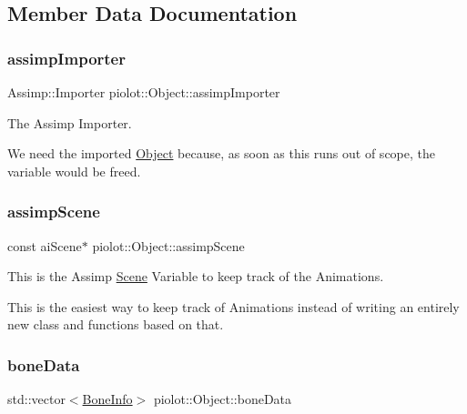 \subsection{Member Data Documentation}
\mbox{\label{classpiolot_1_1_object_a5c3cdbb5520b6ff452a9d248bb359cbd}} 
\subsubsection{\texorpdfstring{assimp\+Importer}{assimpImporter}}
{\footnotesize\ttfamily Assimp\+::\+Importer piolot\+::\+Object\+::assimp\+Importer\hspace{0.3cm}{\ttfamily [protected]}}



The Assimp Importer. 

We need the imported \mbox{\hyperlink{classpiolot_1_1_object}{Object}} because, as soon as this runs out of scope, the  variable would be freed. \mbox{\label{classpiolot_1_1_object_a169e800bae7a051cac9c2e11477a78f9}} 
\subsubsection{\texorpdfstring{assimp\+Scene}{assimpScene}}
{\footnotesize\ttfamily const ai\+Scene$\ast$ piolot\+::\+Object\+::assimp\+Scene\hspace{0.3cm}{\ttfamily [protected]}}



This is the Assimp \mbox{\hyperlink{classpiolot_1_1_scene}{Scene}} Variable to keep track of the Animations. 

This is the easiest way to keep track of Animations instead of writing an entirely new class and functions based on that. \mbox{\label{classpiolot_1_1_object_a0cab740496f8e838feb4268b36180ed7}} 
\subsubsection{\texorpdfstring{bone\+Data}{boneData}}
{\footnotesize\ttfamily std\+::vector$<$\mbox{\hyperlink{structpiolot_1_1_bone_info}{Bone\+Info}}$>$ piolot\+::\+Object\+::bone\+Data\hspace{0.3cm}{\ttfamily [protected]}}



